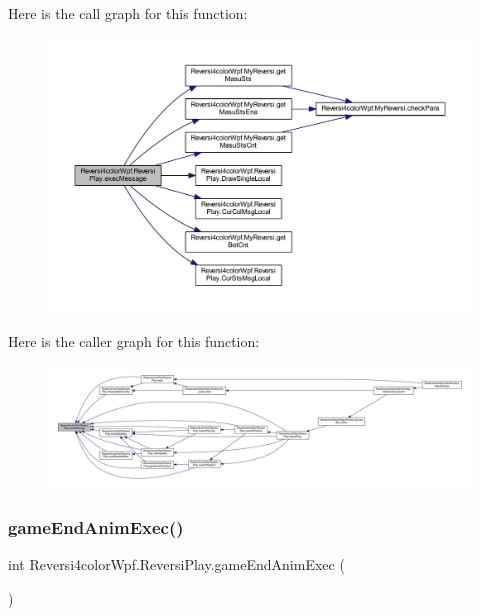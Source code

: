 Here is the call graph for this function\+:
\nopagebreak
\begin{figure}[H]
\begin{center}
\leavevmode
\includegraphics[width=350pt]{class_reversi4color_wpf_1_1_reversi_play_ababce684128da36e97a45ad8a13e4b71_cgraph}
\end{center}
\end{figure}
Here is the caller graph for this function\+:
\nopagebreak
\begin{figure}[H]
\begin{center}
\leavevmode
\includegraphics[width=350pt]{class_reversi4color_wpf_1_1_reversi_play_ababce684128da36e97a45ad8a13e4b71_icgraph}
\end{center}
\end{figure}
\mbox{\label{class_reversi4color_wpf_1_1_reversi_play_a11c4713ab8ff3fde4ebf7b0ab6cc7ed3}} 
\subsubsection{\texorpdfstring{game\+End\+Anim\+Exec()}{gameEndAnimExec()}}
{\footnotesize\ttfamily int Reversi4color\+Wpf.\+Reversi\+Play.\+game\+End\+Anim\+Exec (\begin{DoxyParamCaption}{ }\end{DoxyParamCaption})}



